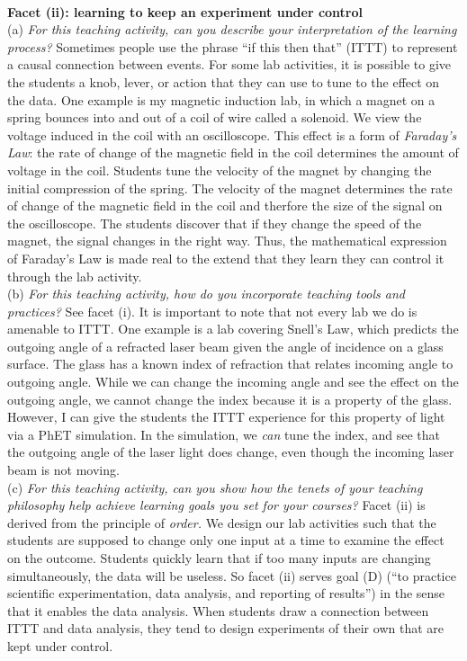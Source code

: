\documentclass[../../../main.tex]{subfiles}
\begin{document}
\\
\vspace{0.25cm}
\textbf{Facet (ii): learning to keep an experiment under control}
\\
\vspace{0.25cm}
(a) \textit{For this teaching activity, can you describe your interpretation of the learning process?}  Sometimes people use the phrase ``if this then that'' (ITTT) to represent a causal connection between events.  For some lab activities, it is possible to give the students a knob, lever, or action that they can use to tune to the effect on the data.  One example is my magnetic induction lab, in which a magnet on a spring bounces into and out of a coil of wire called a solenoid.  We view the voltage induced in the coil with an oscilloscope.  This effect is a form of \textit{Faraday's Law}: the rate of change of the magnetic field in the coil determines the amount of voltage in the coil.  Students tune the velocity of the magnet by changing the initial compression of the spring.  The velocity of the magnet determines the rate of change of the magnetic field in the coil and therfore the size of the signal on the oscilloscope.  The students discover that if they change the speed of the magnet, the signal changes in the right way.  Thus, the mathematical expression of Faraday's Law is made real to the extend that they learn they can control it through the lab activity.  
\\
\vspace{0.25cm}
(b) \textit{For this teaching activity, how do you incorporate teaching tools and practices?}  See facet (i).  It is important to note that not every lab we do is amenable to ITTT.  One example is a lab covering Snell's Law, which predicts the outgoing angle of a refracted laser beam given the angle of incidence on a glass surface.  The glass has a known index of refraction that relates incoming angle to outgoing angle.  While we can change the incoming angle and see the effect on the outgoing angle, we cannot change the index because it is a property of the glass.  However, I can give the students the ITTT experience for this property of light via a PhET simulation.  In the simulation, we \textit{can} tune the index, and see that the outgoing angle of the laser light does change, even though the incoming laser beam is not moving.
\\
\vspace{0.25cm}
(c) \textit{For this teaching activity, can you show how the tenets of your teaching philosophy help achieve learning goals you
set for your courses?}  Facet (ii) is derived from the principle of \textit{order.}  We design our lab activities such that the students are supposed to change only one input at a time to examine the effect on the outcome.  Students quickly learn that if too many inputs are changing simultaneously, the data will be useless.  So facet (ii) serves goal (D) (``to practice scientific experimentation, data analysis, and reporting of results'') in the sense that it enables the data analysis.  When students draw a connection between ITTT and data analysis, they tend to design experiments of their own that are kept under control.
\end{document}
